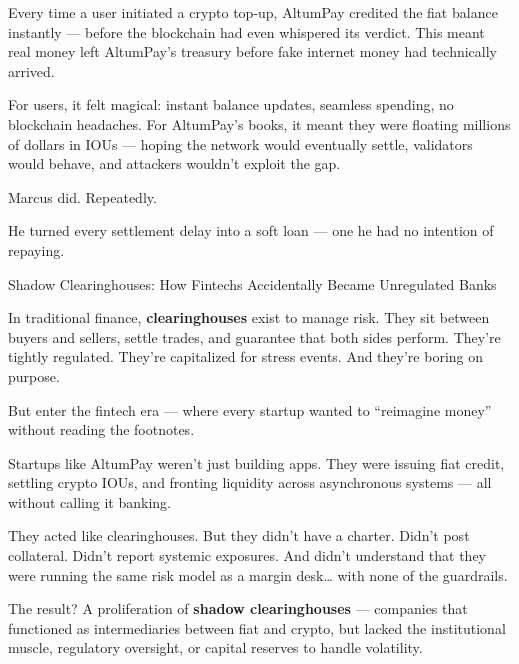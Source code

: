Every time a user initiated a crypto top-up, AltumPay credited the fiat balance instantly —  
before the blockchain had even whispered its verdict.  
This meant real money left AltumPay’s treasury before fake internet money had technically arrived.

For users, it felt magical: instant balance updates, seamless spending, no blockchain headaches.  
For AltumPay’s books, it meant they were floating millions of dollars in IOUs —  
hoping the network would eventually settle, validators would behave, and attackers wouldn’t exploit the gap.

Marcus did.  
Repeatedly.

He turned every settlement delay into a soft loan —  
one he had no intention of repaying.


\begin{HistoricalSidebar}{Shadow Clearinghouses: How Fintechs Accidentally Became Unregulated Banks}

    In traditional finance, \textbf{clearinghouses} exist to manage risk.  
    They sit between buyers and sellers, settle trades, and guarantee that both sides perform.  
    They’re tightly regulated.  
    They’re capitalized for stress events.  
    And they’re boring on purpose.

    \medskip
    
    But enter the fintech era --- where every startup wanted to “reimagine money” without reading the footnotes.
    
    \medskip
    
    Startups like AltumPay weren’t just building apps.  
    They were issuing fiat credit, settling crypto IOUs, and fronting liquidity across asynchronous systems ---  
    all without calling it banking.

    \medskip
    
    They acted like clearinghouses.  
    But they didn’t have a charter.  
    Didn’t post collateral.  
    Didn’t report systemic exposures.  
    And didn’t understand that they were running the same risk model as a margin desk… with none of the guardrails.
    
    \medskip
    
    The result?  A proliferation of \textbf{shadow clearinghouses} ---  
    companies that functioned as intermediaries between fiat and crypto, but lacked the institutional muscle, regulatory oversight, or capital reserves to handle volatility.

    \medskip
    

\end{HistoricalSidebar}
